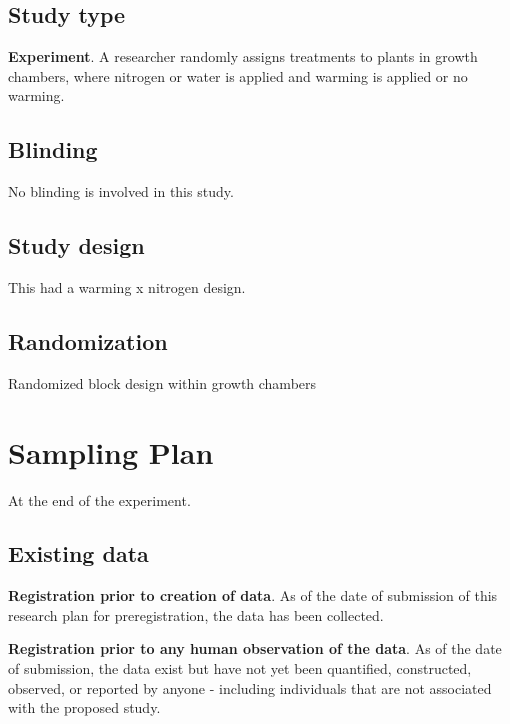 \documentclass[]{article}
\begin{document}
\hypertarget{study-type}{%
\subsection{Study type}\label{study-type}}

\textbf{Experiment}. A researcher randomly assigns treatments to plants
in growth chambers, where nitrogen or water is applied and warming is
applied or no warming.

\hypertarget{blinding}{%
\subsection{Blinding}\label{blinding}}

No blinding is involved in this study.

\hypertarget{study-design}{%
\subsection{Study design}\label{study-design}}

This had a warming x nitrogen design.

\hypertarget{randomization}{%
\subsection{Randomization}\label{randomization}}

Randomized block design within growth chambers

\hypertarget{sampling-plan}{%
\section{Sampling Plan}\label{sampling-plan}}

At the end of the experiment.

\hypertarget{existing-data}{%
\subsection{Existing data}\label{existing-data}}

\textbf{Registration prior to creation of data}. As of the date of
submission of this research plan for preregistration, the data has been
collected.

\textbf{Registration prior to any human observation of the data}. As of
the date of submission, the data exist but have not yet been quantified,
constructed, observed, or reported by anyone - including individuals
that are not associated with the proposed study.
\end{document}
